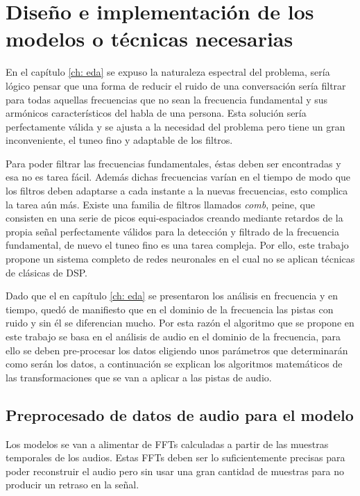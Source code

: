 \chapter{Diseño e implementación de los modelos o técnicas necesarias}\label{ch: modelDesign}
En el capítulo \ref{ch: eda} se expuso la naturaleza espectral del problema, sería lógico pensar que una forma de reducir el ruido de una conversación sería filtrar para todas aquellas frecuencias que no sean la frecuencia fundamental y sus armónicos característicos del habla de una persona. Esta solución sería perfectamente válida y se ajusta a la necesidad del problema pero tiene un gran inconveniente, el tuneo fino y adaptable de los filtros.

Para poder filtrar las frecuencias fundamentales, éstas deben ser encontradas y esa no es tarea fácil. Además dichas frecuencias varían en el tiempo de modo que los filtros deben adaptarse a cada instante a la nuevas frecuencias, esto complica la tarea aún más. Existe una familia de filtros llamados \textit{comb}, peine, que consisten en una serie de picos equi-espaciados creando mediante retardos de la propia señal perfectamente válidos para la detección y filtrado de la frecuencia fundamental\cite{1035730}, de nuevo el tuneo fino es una tarea compleja. Por ello, este trabajo propone un sistema completo de redes neuronales en el cual no se aplican técnicas de clásicas de \gls{DSP}.

Dado que el en capítulo \ref{ch: eda} se presentaron los análisis en frecuencia y en tiempo, quedó de manifiesto que en el dominio de la frecuencia las pistas con ruido y sin él se diferencian mucho. Por esta razón el algoritmo que se propone en este trabajo se basa en el análisis de audio en el dominio de la frecuencia, para ello se deben pre-procesar los datos eligiendo unos parámetros que determinarán como serán los datos, a continuación se explican los algoritmos matemáticos de las transformaciones que se van a aplicar a las pistas de audio.

\section{Preprocesado de datos de audio para el modelo}
Los modelos se van a alimentar de \glspl{FFT} calculadas a partir de las muestras temporales de los audios. Estas \glspl{FFT} deben ser lo suficientemente precisas para poder reconstruir el audio pero sin usar una gran cantidad de muestras para no producir un retraso en la señal.

